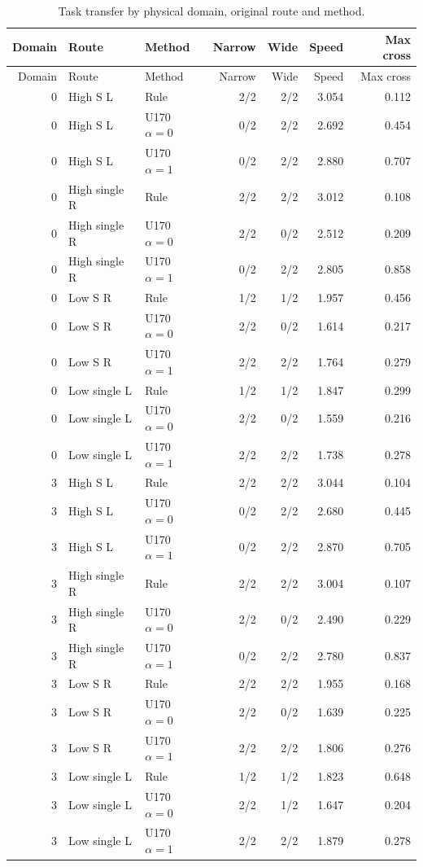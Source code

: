 \documentclass[11pt,a4paper]{article}
\begin{document}
\begin{longtable}{rllrrrr}
\caption{Task transfer by physical domain, original route and method.\label{tab:domain}}\\
\toprule
Domain & Route & Method & Narrow & Wide & Speed & Max cross \\
\midrule
\endfirsthead
\toprule
Domain & Route & Method & Narrow & Wide & Speed & Max cross \\
\midrule
\endhead
0 & High S L & Rule & 2/2 & 2/2 & 3.054 & 0.112 \\
0 & High S L & U170 $\alpha=0$ & 0/2 & 2/2 & 2.692 & 0.454 \\
0 & High S L & U170 $\alpha=1$ & 0/2 & 2/2 & 2.880 & 0.707 \\
0 & High single R & Rule & 2/2 & 2/2 & 3.012 & 0.108 \\
0 & High single R & U170 $\alpha=0$ & 2/2 & 0/2 & 2.512 & 0.209 \\
0 & High single R & U170 $\alpha=1$ & 0/2 & 2/2 & 2.805 & 0.858 \\
0 & Low S R & Rule & 1/2 & 1/2 & 1.957 & 0.456 \\
0 & Low S R & U170 $\alpha=0$ & 2/2 & 0/2 & 1.614 & 0.217 \\
0 & Low S R & U170 $\alpha=1$ & 2/2 & 2/2 & 1.764 & 0.279 \\
0 & Low single L & Rule & 1/2 & 1/2 & 1.847 & 0.299 \\
0 & Low single L & U170 $\alpha=0$ & 2/2 & 0/2 & 1.559 & 0.216 \\
0 & Low single L & U170 $\alpha=1$ & 2/2 & 2/2 & 1.738 & 0.278 \\
3 & High S L & Rule & 2/2 & 2/2 & 3.044 & 0.104 \\
3 & High S L & U170 $\alpha=0$ & 0/2 & 2/2 & 2.680 & 0.445 \\
3 & High S L & U170 $\alpha=1$ & 0/2 & 2/2 & 2.870 & 0.705 \\
3 & High single R & Rule & 2/2 & 2/2 & 3.004 & 0.107 \\
3 & High single R & U170 $\alpha=0$ & 2/2 & 0/2 & 2.490 & 0.229 \\
3 & High single R & U170 $\alpha=1$ & 0/2 & 2/2 & 2.780 & 0.837 \\
3 & Low S R & Rule & 2/2 & 2/2 & 1.955 & 0.168 \\
3 & Low S R & U170 $\alpha=0$ & 2/2 & 0/2 & 1.639 & 0.225 \\
3 & Low S R & U170 $\alpha=1$ & 2/2 & 2/2 & 1.806 & 0.276 \\
3 & Low single L & Rule & 1/2 & 1/2 & 1.823 & 0.648 \\
3 & Low single L & U170 $\alpha=0$ & 2/2 & 1/2 & 1.647 & 0.204 \\
3 & Low single L & U170 $\alpha=1$ & 2/2 & 2/2 & 1.879 & 0.278 \\
\bottomrule
\end{longtable}
\end{document}
